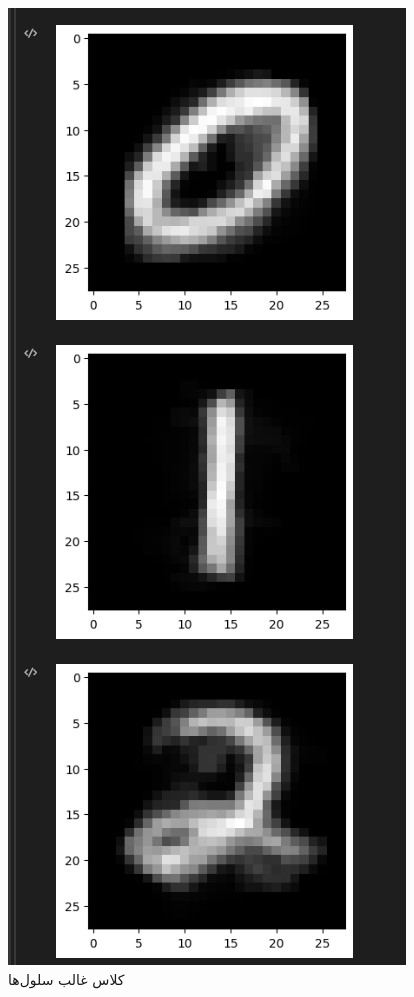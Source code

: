 \documentclass{article}
\begin{document}
\begin{figure}[!h]
    \centering\includegraphics[scale=.65]{./p6-3}
    \caption{کلاس غالب سلول‌ها}\label{fig.63}
\end{figure}
\end{document}
